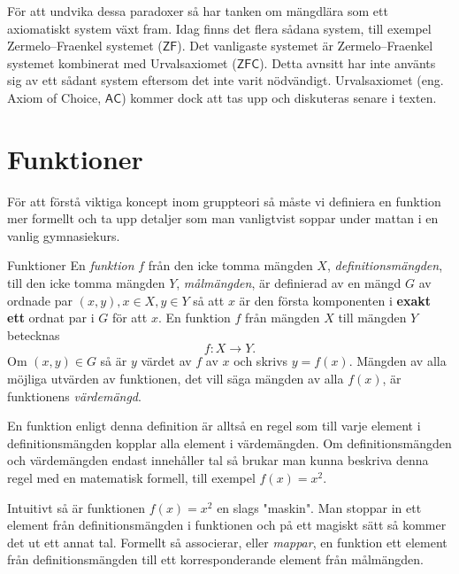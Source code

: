\documentclass{article}
\theoremstyle{definition}
\begin{document}
För att undvika dessa paradoxer så har tanken om mängdlära som ett axiomatiskt system växt fram. 
Idag finns det flera sådana system, till exempel Zermelo–Fraenkel systemet ($\mathsf{ZF}$). Det vanligaste 
systemet är Zermelo–Fraenkel systemet kombinerat med Urvalsaxiomet ($\mathsf{ZFC}$). Detta avnsitt har inte använts sig 
av ett sådant system eftersom det inte varit nödvändigt. 
Urvalsaxiomet (eng. Axiom of Choice, $\mathsf{AC}$) kommer dock att 
tas upp och diskuteras senare i texten.

\section{Funktioner}
För att förstå viktiga koncept inom gruppteori så måste vi definiera en funktion mer formellt och ta upp detaljer som man vanligtvist soppar under mattan i en vanlig gymnasiekurs.

\begin{mydef}{Funktioner}{}
  En \textit{funktion} $f$ från den icke tomma mängden $X$, \textit{definitionsmängden}, till den icke tomma mängden $Y$, \textit{målmängden}, är definierad 
  av en mängd $G$ av ordnade par $(x, y), x \in X, y \in Y$ så att $x$ är den första komponenten i \textbf{exakt ett} ordnat par i $G$ för att $x$. En funktion $f$ från mängden $X$
  till mängden $Y$ betecknas
  \[f: X \rightarrow Y.\]
  Om $(x, y) \in G$ så är $y$ värdet av $f$ av $x$ och skrivs $y=f(x)$. Mängden av alla möjliga utvärden av funktionen, det vill säga mängden av alla $f(x)$, är funktionens \textit{värdemängd}.
\end{mydef}

En funktion enligt denna definition är alltså en regel som till varje element i definitionsmängden kopplar alla element i värdemängden. Om definitionsmängden och värdemängden endast innehåller
tal så brukar man kunna beskriva denna regel med en matematisk formell, till exempel $f(x) = x^2$.

Intuitivt så är funktionen $f(x) = x^2$ en slags "maskin". Man stoppar in ett element från definitionsmängden i funktionen och på ett magiskt sätt 
så kommer det ut ett annat tal. Formellt så associerar,
eller \textit{mappar}, en funktion ett element från definitionsmängden till ett korresponderande element från målmängden.


\begin{center}
\end{center}
\end{document}

